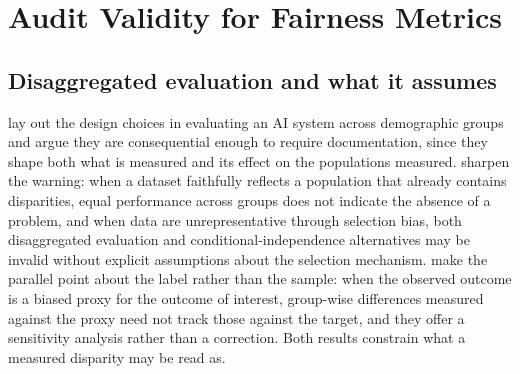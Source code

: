 %

\section{Audit Validity for Fairness Metrics}
\label{sup:s2}

\subsection{Disaggregated evaluation and what it assumes}

\citet{barocas2021disaggregated} lay out the design choices in evaluating an AI system across
demographic groups and argue they are consequential enough to require documentation, since
they shape both what is measured and its effect on the populations measured.
\citet{pfohl2025disaggregated} sharpen the warning: when a dataset faithfully reflects a
population that already contains disparities, equal performance across groups does not
indicate the absence of a problem, and when data are unrepresentative through selection bias,
both disaggregated evaluation and conditional-independence alternatives may be invalid without
explicit assumptions about the selection mechanism. \citet{fogliato2020fairness} make the
parallel point about the label rather than the sample: when the observed outcome is a biased
proxy for the outcome of interest, group-wise differences measured against the proxy need not
track those against the target, and they offer a sensitivity analysis rather than a
correction. Both results constrain what a measured disparity may be read as.

